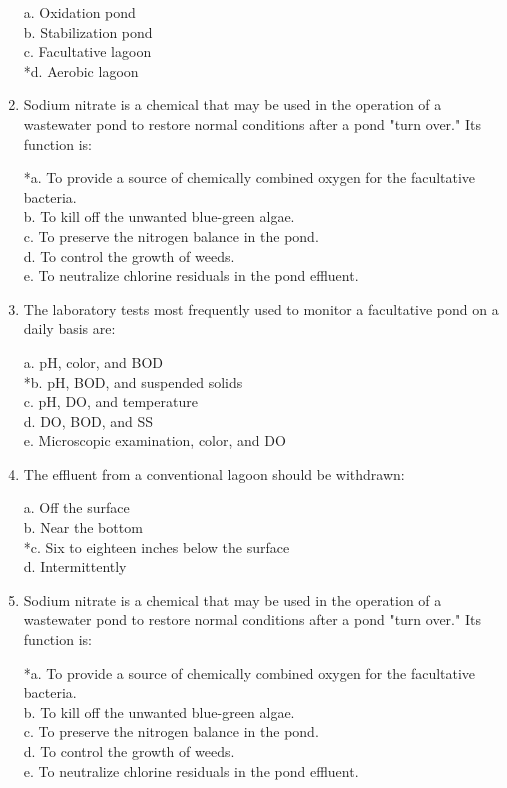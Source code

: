 \begin{enumerate}
a. Oxidation pond \\
b. Stabilization pond \\
c. Facultative lagoon \\
*d. Aerobic lagoon 


\item  Sodium nitrate is a chemical that may be used in the operation of a wastewater pond to restore normal conditions after a pond "turn over." Its function is: 

*a. To provide a source of chemically combined oxygen for the facultative bacteria. \\
b. To kill off the unwanted blue-green algae. \\
c. To preserve the nitrogen balance in the pond. \\
d. To control the growth of weeds. \\
e. To neutralize chlorine residuals in the pond effluent. 


\item  The laboratory tests most frequently used to monitor a facultative pond on a daily basis are: 

a. pH, color, and BOD \\
*b. pH, BOD, and suspended solids \\
c. pH, DO, and temperature \\
d. DO, BOD, and SS \\
e. Microscopic examination, color, and DO 


\item  The effluent from a conventional lagoon should be withdrawn: 

a. Off the surface \\
b. Near the bottom \\
*c. Six to eighteen inches below the surface \\
d. Intermittently 


\item  Sodium nitrate is a chemical that may be used in the operation of a wastewater pond to restore normal conditions after a pond "turn over." Its function is: 

*a. To provide a source of chemically combined oxygen for the facultative bacteria. \\
b. To kill off the unwanted blue-green algae. \\
c. To preserve the nitrogen balance in the pond. \\
d. To control the growth of weeds. \\
e. To neutralize chlorine residuals in the pond effluent. 



\end{enumerate}
